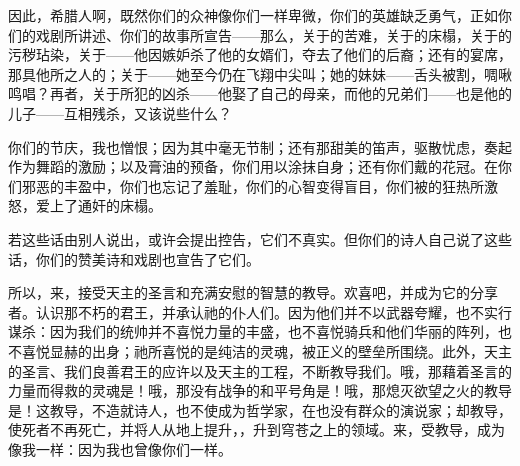 因此，希腊人啊，既然你们的众神像你们一样卑微，你们的英雄缺乏勇气，正如你们的戏剧所讲述、你们的故事所宣告——那么，关于的苦难，关于的床榻，关于的污秽玷染，关于——他因嫉妒杀了他的女婿们，夺去了他们的后裔；还有的宴席，那具他所之人的；关于——她至今仍在飞翔中尖叫；她的妹妹——舌头被割，啁啾鸣唱？再者，关于所犯的凶杀——他娶了自己的母亲，而他的兄弟们——也是他的儿子——互相残杀，又该说些什么？\par

你们的节庆，我也憎恨；因为其中毫无节制；还有那甜美的笛声，驱散忧虑，奏起作为舞蹈的激励；以及膏油的预备，你们用以涂抹自身；还有你们戴的花冠。在你们邪恶的丰盈中，你们也忘记了羞耻，你们的心智变得盲目，你们被的狂热所激怒，爱上了通奸的床榻。\par

若这些话由别人说出，或许会提出控告，它们不真实。但你们的诗人自己说了这些话，你们的赞美诗和戏剧也宣告了它们。\par

所以，来，接受天主的圣言和充满安慰的智慧的教导。欢喜吧，并成为它的分享者。认识那不朽的君王，并承认祂的仆人们。因为他们并不以武器夸耀，也不实行谋杀：因为我们的统帅并不喜悦力量的丰盛，也不喜悦骑兵和他们华丽的阵列，也不喜悦显赫的出身；祂所喜悦的是纯洁的灵魂，被正义的壁垒所围绕。此外，天主的圣言、我们良善君王的应许以及天主的工程，不断教导我们。哦，那藉着圣言的力量而得救的灵魂是！哦，那没有战争的和平号角是！哦，那熄灭欲望之火的教导是！这教导，不造就诗人，也不使成为哲学家，在也没有群众的演说家；却教导，使死者不再死亡，并将人从地上提升，，升到穹苍之上的领域。来，受教导，成为像我一样：因为我也曾像你们一样。\par

